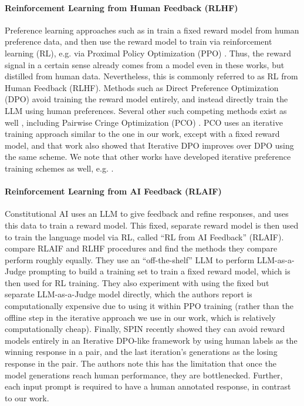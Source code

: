 \documentclass{article}
\begin{document}
\paragraph{Reinforcement Learning from Human Feedback (RLHF)}
Preference learning approaches such as in \citet{ziegler2019fine,stiennon2020learning,ouyang2022training,bai2022training}
train a fixed reward model from human preference data, and then use the reward model to train via reinforcement learning (RL), e.g. via Proximal Policy Optimization (PPO) \citep{schulman2017proximal}. Thus, the reward signal  in a certain sense  already comes from a model even in these works, but distilled from human data. Nevertheless, this is  commonly referred to as RL from Human Feedback (RLHF). 
Methods such as Direct Preference Optimization (DPO) \citep{rafailov2023direct} avoid training the reward model 
entirely, and instead directly train the LLM using human preferences. Several other such competing methods exist as well \citep{zhao2023slic,zheng2023click,yuan2023rrhf}, including Pairwise Cringe Optimization (PCO) \citep{xu2023some}. 
PCO uses an iterative training approach similar to the one in our work, except with a fixed reward model, and that work also showed that Iterative DPO improves over DPO using the same scheme.
We note that other works have developed iterative preference training schemes
as well, e.g. \citet{adolphs2022cringe,gulcehre2023reinforced,xiong2023gibbs}.

\paragraph{Reinforcement Learning from AI Feedback (RLAIF)}
Constitutional AI \citep{bai2022constitutional}
uses an LLM to give feedback and refine responses, and uses this data to train a reward model. This fixed, separate reward model is then used  to train the language model via RL, called  ``RL from AI Feedback'' (RLAIF). 
\citet{lee2023rlaif} compare RLAIF and RLHF procedures and find the methods they compare perform roughly equally. They
use an  ``off-the-shelf'' LLM to perform LLM-as-a-Judge prompting to build a training set to train a fixed reward model, which is then used for RL training. They also experiment with using the fixed but separate LLM-as-a-Judge model directly, which the authors report is computationally expensive due to using it within PPO training (rather than the offline step in the iterative approach we use in our work, which is relatively computationally cheap).
Finally, SPIN \citep{chen2024self} recently showed they can avoid reward models entirely in an Iterative DPO-like framework by using human labels as the winning response in a pair, and the last iteration's generations as the losing response in the pair. The authors note this has the limitation that once the model generations reach human performance, they are bottlenecked. Further, each input prompt is required to have a human annotated response, in contrast to our work.
\end{document}
